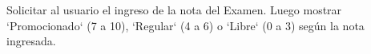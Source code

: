 ﻿
Solicitar al usuario el ingreso de la nota del Examen. Luego mostrar `Promocionado` (7 a 10), `Regular` (4 a 6) o `Libre` (0 a 3) según la nota ingresada.



\volverindice
\newpage
